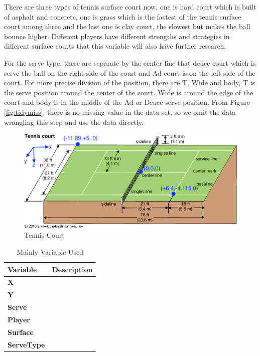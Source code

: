 \documentclass[11pt,a4paper,]{article}
\begin{document}
There are three types of tennis surface court now, one is hard court which is built of asphalt and concrete, one is grass which is the fastest of the tennis surface court among three and the last one is clay court, the slowest but makes the ball bounce higher. Different players have different strengths and strategies in different surface courts that this variable will also have further research.

For the serve type, there are separate by the center line that deuce court which is serve the ball on the right side of the court and Ad court is on the left side of the court. For more precise division of the position, there are T, Wide and body, T is the serve position around the center of the court, Wide is around the edge of the court and body is in the middle of the Ad or Deuce serve position.
From Figure \ref{fig:tidymiss}, there is no missing value in the data set, so we omit the data wrangling this step and use the data directly.

\begin{figure}

{\centering \includegraphics[width=0.7\linewidth]{image/tennis_court} 

}

\caption{Tennis Court}\label{fig:court}
\end{figure}

\begin{table}

\caption{\label{tab:datable}Mainly Variable Used}
\centering
\begin{tabular}[t]{>{}l||>{\raggedright\arraybackslash}p{30em}}
\hline
Variable & Description\\
\hline
\textbf{X} & \cellcolor{white}{Length of the Position(-23.77, 23.77)}\\
\hline
\textbf{Y} & \cellcolor{white}{Lateral of the Position(-11.89, 11.89)}\\
\hline
\textbf{Serve} & \cellcolor{white}{Serve Number(First Serve, Second Serve)}\\
\hline
\textbf{Player} & \cellcolor{white}{Tennis Player Name(84 Players)}\\
\hline
\textbf{Surface} & \cellcolor{white}{Surface Type(Hard, Clay, Grass)}\\
\hline
\textbf{ServeType} & \cellcolor{white}{Serve Direction(AdBody, AdWide, AdT,DeuceBody, DeuceWide, DeuceT)}\\
\hline
\end{tabular}
\end{table}
\end{document}
